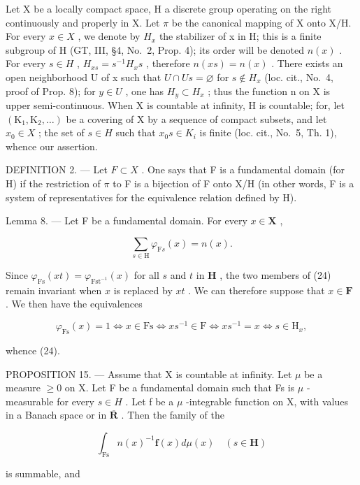 Let X be a locally compact space, H a discrete group operating on the right continuously and properly in X. Let \(\pi\) be the canonical mapping of X onto X/H. For every \(x \in X\) , we denote by \(H_x\) the stabilizer of x in H; this is a finite subgroup of H (GT, III, §4, No.~2, Prop. 4); its order will be denoted \(n(x)\) . For every \(s \in H\) , \(H_{xs} = s^{-1}H_x s\) , therefore \(n(xs) = n(x)\) . There exists an open neighborhood U of x such that \(U \cap Us = \varnothing\) for \(s \notin H_x\) (loc. cit., No.~4, proof of Prop. 8); for \(y \in U\) , one has \(H_y \subset H_x\) ; thus the function n on X is upper semi-continuous. When X is countable at infinity, H is countable; for, let \((\mathrm{K}_1, \mathrm{K}_2, \ldots)\) be a covering of X by a sequence of compact subsets, and let \(x_{0} \in X\) ; the set of \(s \in H\) such that \(x_{0}s \in K_{i}\) is finite (loc. cit., No.~5, Th. 1), whence our assertion.

DEFINITION 2. --- Let \(F \subset X\) . One says that F is a fundamental domain (for H) if the restriction of \(\pi\) to F is a bijection of F onto X/H (in other words, F is a system of representatives for the equivalence relation defined by H).

Lemma 8. --- Let F be a fundamental domain. For every \(x \in \mathbf{X}\) ,

\[
\sum_ {s \in \mathrm{H}} \varphi_ {\mathrm{F} s} (x) = n (x).\tag{24}
\]

Since \(\varphi_{\mathrm{Fs}}(xt) = \varphi_{\mathrm{Fst}^{-1}}(x)\) for all \(s\) and \(t\) in \(\mathbf{H}\) , the two members of (24) remain invariant when \(x\) is replaced by \(xt\) . We can therefore suppose that \(x \in \mathbf{F}\) . We then have the equivalences

\[
\varphi_ {\mathrm{Fs}} (x) = 1 \Leftrightarrow x \in \mathrm{Fs} \Leftrightarrow x s ^ {- 1} \in \mathrm{F} \Leftrightarrow x s ^ {- 1} = x \Leftrightarrow s \in \mathrm{H} _ {x},
\]

whence (24).

PROPOSITION 15. --- Assume that X is countable at infinity. Let \(\mu\) be a measure \(\geqslant 0\) on X. Let F be a fundamental domain such that Fs is \(\mu\) -measurable for every \(s \in H\) . Let f be a \(\mu\) -integrable function on X, with values in a Banach space or in \(\overline{\mathbf{R}}\) . Then the family of the

\[
\int_ {\mathrm{Fs}} n (x) ^ {- 1} \mathbf {f} (x) d \mu (x) \quad (s \in \mathbf {H})
\]

is summable, and

